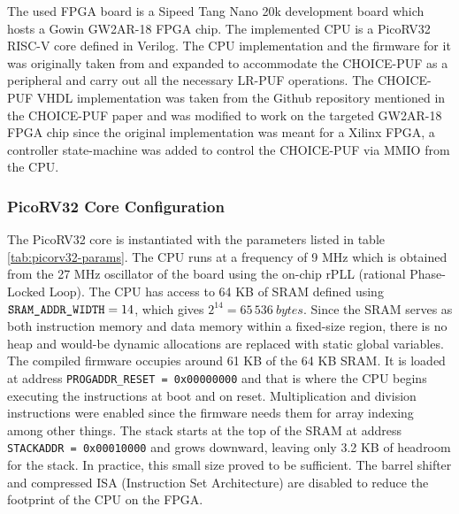 The used FPGA board is a Sipeed Tang Nano 20k development board \cite{sipeed_tang_nano_20k} which hosts a Gowin GW2AR-18 FPGA chip. The implemented CPU is a PicoRV32 RISC-V core \cite{picoRV32} defined in Verilog. The CPU implementation and the firmware for it was originally taken from \cite{picorv32_tang_nano_unified} and expanded to accommodate the CHOICE-PUF as a peripheral and carry out all the necessary LR-PUF operations. The CHOICE-PUF VHDL implementation was taken from the Github repository \cite{choice_puf_repo} mentioned in the CHOICE-PUF paper \cite{9556423} and was modified to work on the targeted GW2AR-18 FPGA chip since the original implementation was meant for a Xilinx FPGA, a controller state-machine was added to control the CHOICE-PUF via MMIO from the CPU.

\subsubsection{PicoRV32 Core Configuration}
The PicoRV32 core is instantiated with the parameters listed in table \ref{tab:picorv32-params}. The CPU runs at a frequency of 9 MHz which is obtained from the 27 MHz oscillator of the board using the on-chip rPLL (rational Phase-Locked Loop). The CPU has access to 64 KB of SRAM defined using $\verb|SRAM_ADDR_WIDTH|=14$, which gives $2^{14}=65\,536~bytes$. Since the SRAM serves as both instruction memory and data memory within a fixed-size region, there is no heap and would-be dynamic allocations are replaced with static global variables. The compiled firmware occupies around 61 KB of the 64 KB SRAM. It is loaded at address \verb|PROGADDR_RESET = 0x00000000| and that is where the CPU begins executing the instructions at boot and on reset. Multiplication and division instructions were enabled since the firmware needs them for array indexing among other things. The stack starts at the top of the SRAM at address \verb|STACKADDR = 0x00010000| and grows downward, leaving only 3.2 KB of headroom for the stack. In practice, this small size proved to be sufficient. The barrel shifter and compressed ISA (Instruction Set Architecture) are disabled to reduce the footprint of the CPU on the FPGA. 

